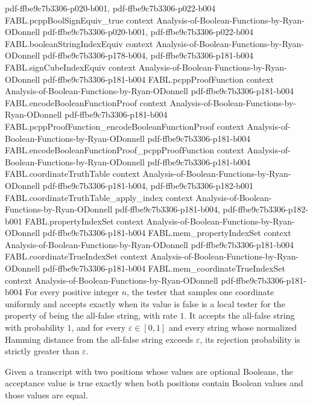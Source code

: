 \begin{theorem}
  {pdf-ffbe9c7b3306-p020-b001,
    pdf-ffbe9c7b3306-p022-b004}
\proofstep
  {FABL.pcppBoolSignEquiv_true}
  {context}
  {Analysis-of-Boolean-Functions-by-Ryan-ODonnell}
  {pdf-ffbe9c7b3306-p020-b001,
    pdf-ffbe9c7b3306-p022-b004}
\proofstep
  {FABL.booleanStringIndexEquiv}
  {context}
  {Analysis-of-Boolean-Functions-by-Ryan-ODonnell}
  {pdf-ffbe9c7b3306-p178-b004,
    pdf-ffbe9c7b3306-p181-b004}
\proofstep
  {FABL.signCubeIndexEquiv}
  {context}
  {Analysis-of-Boolean-Functions-by-Ryan-ODonnell}
  {pdf-ffbe9c7b3306-p181-b004}
\proofstep
  {FABL.pcppProofFunction}
  {context}
  {Analysis-of-Boolean-Functions-by-Ryan-ODonnell}
  {pdf-ffbe9c7b3306-p181-b004}
\proofstep
  {FABL.encodeBooleanFunctionProof}
  {context}
  {Analysis-of-Boolean-Functions-by-Ryan-ODonnell}
  {pdf-ffbe9c7b3306-p181-b004}
\proofstep
  {FABL.pcppProofFunction_encodeBooleanFunctionProof}
  {context}
  {Analysis-of-Boolean-Functions-by-Ryan-ODonnell}
  {pdf-ffbe9c7b3306-p181-b004}
\proofstep
  {FABL.encodeBooleanFunctionProof_pcppProofFunction}
  {context}
  {Analysis-of-Boolean-Functions-by-Ryan-ODonnell}
  {pdf-ffbe9c7b3306-p181-b004}
\proofstep
  {FABL.coordinateTruthTable}
  {context}
  {Analysis-of-Boolean-Functions-by-Ryan-ODonnell}
  {pdf-ffbe9c7b3306-p181-b004,
    pdf-ffbe9c7b3306-p182-b001}
\proofstep
  {FABL.coordinateTruthTable_apply_index}
  {context}
  {Analysis-of-Boolean-Functions-by-Ryan-ODonnell}
  {pdf-ffbe9c7b3306-p181-b004,
    pdf-ffbe9c7b3306-p182-b001}
\proofstep
  {FABL.propertyIndexSet}
  {context}
  {Analysis-of-Boolean-Functions-by-Ryan-ODonnell}
  {pdf-ffbe9c7b3306-p181-b004}
\proofstep
  {FABL.mem_propertyIndexSet}
  {context}
  {Analysis-of-Boolean-Functions-by-Ryan-ODonnell}
  {pdf-ffbe9c7b3306-p181-b004}
\proofstep
  {FABL.coordinateTrueIndexSet}
  {context}
  {Analysis-of-Boolean-Functions-by-Ryan-ODonnell}
  {pdf-ffbe9c7b3306-p181-b004}
\proofstep
  {FABL.mem_coordinateTrueIndexSet}
  {context}
  {Analysis-of-Boolean-Functions-by-Ryan-ODonnell}
  {pdf-ffbe9c7b3306-p181-b004}
For every positive integer $n$, the tester that samples one coordinate uniformly and
accepts exactly when its value is false is a local tester for the property of being the
all-false string, with rate $1$. It accepts the all-false string with probability $1$,
and for every $\varepsilon\in[0,1]$ and every string whose normalized Hamming distance
from the all-false string exceeds $\varepsilon$, its rejection probability is strictly
greater than $\varepsilon$.
\end{theorem}

\begin{definition}
\label{FABL.allEqualTranscriptAccept}
\leanok
Given a transcript with two positions whose values are optional Booleans, the acceptance
value is true exactly when both positions contain Boolean values and those values are
equal.
\end{definition}

